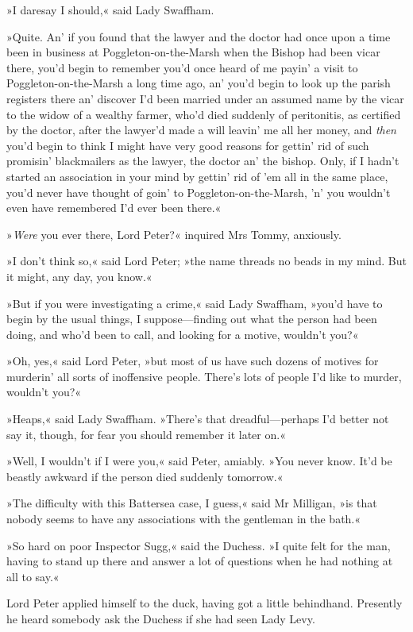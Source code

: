 »I daresay I should,« said Lady Swaffham.

»Quite. An' if you found that the lawyer and the doctor had once upon a time been in business at Poggleton-on-the-Marsh when the Bishop had been vicar there, you'd begin to remember you'd once heard of me payin' a visit to Poggleton-on-the-Marsh a long time ago, an' you'd begin to look up the parish registers there an' discover I'd been married under an assumed name by the vicar to the widow of a wealthy farmer, who'd died suddenly of peritonitis, as certified by the doctor, after the lawyer'd made a will leavin' me all her money, and \textit{then} you'd begin to think I might have very good reasons for gettin' rid of such promisin' blackmailers as the lawyer, the doctor an' the bishop. Only, if I hadn't started an association in your mind by gettin' rid of 'em all in the same place, you'd never have thought of goin' to Poggleton-on-the-Marsh, 'n' you wouldn't even have remembered I'd ever been there.«

»\textit{Were} you ever there, Lord Peter?« inquired Mrs Tommy, anxiously.

»I don't think so,« said Lord Peter; »the name threads no beads in my mind. But it might, any day, you know.«

»But if you were investigating a crime,« said Lady Swaffham, »you'd have to begin by the usual things, I suppose—finding out what the person had been doing, and who'd been to call, and looking for a motive, wouldn't you?«

»Oh, yes,« said Lord Peter, »but most of us have such dozens of motives for murderin' all sorts of inoffensive people. There's lots of people I'd like to murder, wouldn't you?«

»Heaps,« said Lady Swaffham. »There's that dreadful—perhaps I'd better not say it, though, for fear you should remember it later on.«

»Well, I wouldn't if I were you,« said Peter, amiably. »You never know. It'd be beastly awkward if the person died suddenly tomorrow.«

»The difficulty with this Battersea case, I guess,« said Mr Milligan, »is that nobody seems to have any associations with the gentleman in the bath.«

»So hard on poor Inspector Sugg,« said the Duchess. »I quite felt for the man, having to stand up there and answer a lot of questions when he had nothing at all to say.«

Lord Peter applied himself to the duck, having got a little behindhand. Presently he heard somebody ask the Duchess if she had seen Lady Levy.

